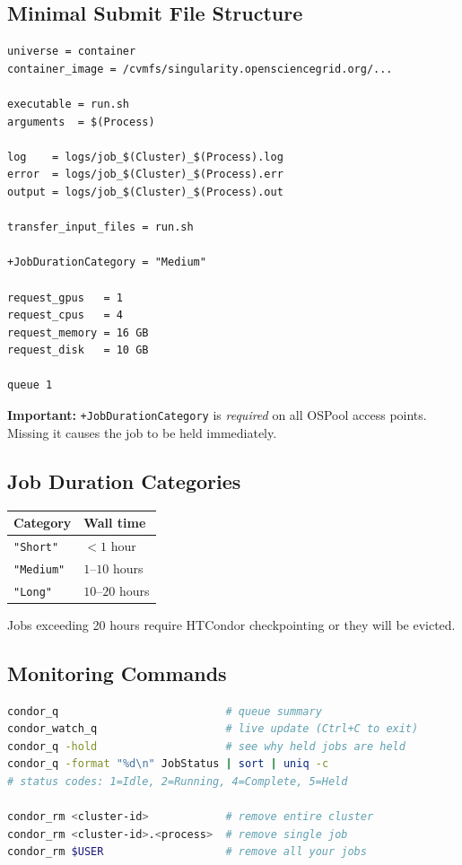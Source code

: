 \documentclass[11pt]{article}
\begin{document}
\subsection{Minimal Submit File Structure}

\begin{lstlisting}
universe = container
container_image = /cvmfs/singularity.opensciencegrid.org/...

executable = run.sh
arguments  = $(Process)

log    = logs/job_$(Cluster)_$(Process).log
error  = logs/job_$(Cluster)_$(Process).err
output = logs/job_$(Cluster)_$(Process).out

transfer_input_files = run.sh

+JobDurationCategory = "Medium"

request_gpus   = 1
request_cpus   = 4
request_memory = 16 GB
request_disk   = 10 GB

queue 1
\end{lstlisting}

\textbf{Important:} \texttt{+JobDurationCategory} is \emph{required} on all
OSPool access points. Missing it causes the job to be held immediately.

\subsection{Job Duration Categories}

\begin{center}
\begin{tabular}{ll}
\toprule
Category & Wall time \\
\midrule
\texttt{"Short"}  & $< 1$ hour \\
\texttt{"Medium"} & $1$--$10$ hours \\
\texttt{"Long"}   & $10$--$20$ hours \\
\bottomrule
\end{tabular}
\end{center}

Jobs exceeding 20 hours require HTCondor checkpointing or they will be evicted.

\subsection{Monitoring Commands}

\begin{lstlisting}[language=bash]
condor_q                          # queue summary
condor_watch_q                    # live update (Ctrl+C to exit)
condor_q -hold                    # see why held jobs are held
condor_q -format "%d\n" JobStatus | sort | uniq -c
# status codes: 1=Idle, 2=Running, 4=Complete, 5=Held

condor_rm <cluster-id>            # remove entire cluster
condor_rm <cluster-id>.<process>  # remove single job
condor_rm $USER                   # remove all your jobs
\end{lstlisting}
\end{document}
